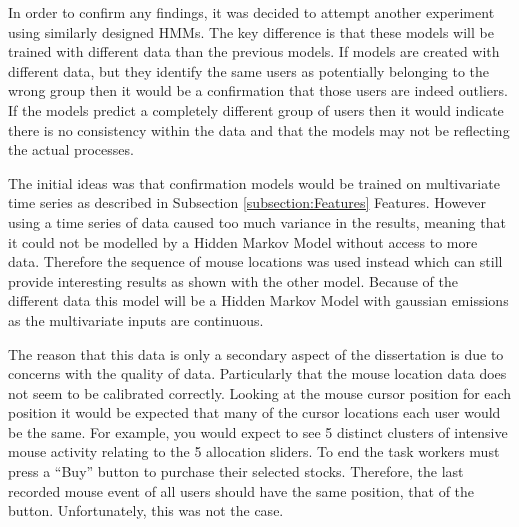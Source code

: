 \documentclass{article}
\begin{document}

In order to confirm any findings, it was decided to attempt another experiment using similarly designed HMMs.
The key difference is that these models will be trained with different data than the previous models.
If models are created with different data, but they identify the same users as potentially belonging to the wrong group then it would be a confirmation that those users are indeed outliers.
If the models predict a completely different group of users then it would indicate there is no consistency within the data and that the models may not be reflecting the actual processes.  


The initial ideas was that confirmation models would be trained on multivariate time series as described in Subsection \ref{subsection:Features} Features.
However using a time series of data caused too much variance in the results, meaning that it could not be modelled by a Hidden Markov Model without access to more data.
Therefore the sequence of mouse locations was used instead which can still provide interesting results as shown with the other model.
Because of the different data this model will be a Hidden Markov Model with gaussian emissions as the multivariate inputs are continuous.

The reason that this data is only a secondary aspect of the dissertation is due to concerns with the quality of data.
Particularly that the mouse location data does not seem to be calibrated correctly.
Looking at the mouse cursor position for each position it would be expected that many of the cursor locations each user would be the same.
For example, you would expect to see 5 distinct clusters of intensive mouse activity relating to the 5 allocation sliders.
To end the task workers must press a ``Buy'' button to purchase their selected stocks.
Therefore, the last recorded mouse event of all users should have the same position, that of the button.
Unfortunately, this was not the case.
\end{document}
